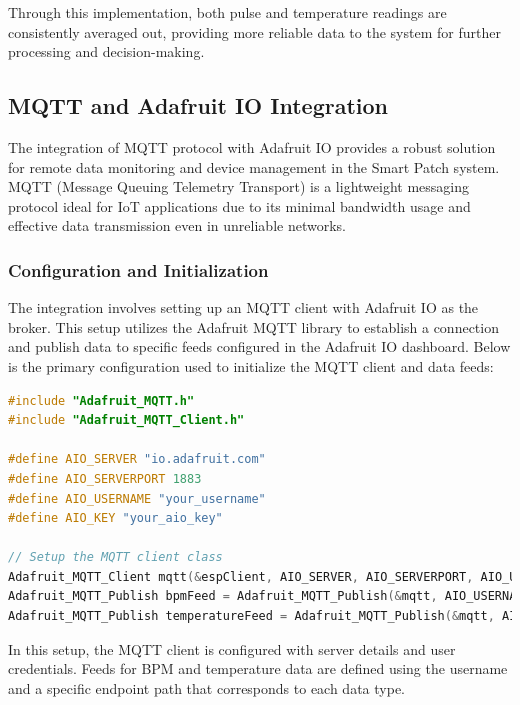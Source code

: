 \noindent Through this implementation, both pulse and temperature readings are consistently averaged out, providing more reliable data to the system for further processing and decision-making.




\subsection{MQTT and Adafruit IO Integration}

The integration of MQTT protocol with Adafruit IO provides a robust solution for remote data monitoring and device management in the Smart Patch system. MQTT (Message Queuing Telemetry Transport) is a lightweight messaging protocol ideal for IoT applications due to its minimal bandwidth usage and effective data transmission even in unreliable networks.

\subsubsection{Configuration and Initialization}

The integration involves setting up an MQTT client with Adafruit IO as the broker. This setup utilizes the Adafruit MQTT library to establish a connection and publish data to specific feeds configured in the Adafruit IO dashboard. Below is the primary configuration used to initialize the MQTT client and data feeds:

\begin{lstlisting}[language=C++, caption={MQTT and Adafruit IO Client Configuration}]
#include "Adafruit_MQTT.h"
#include "Adafruit_MQTT_Client.h"

#define AIO_SERVER "io.adafruit.com"
#define AIO_SERVERPORT 1883
#define AIO_USERNAME "your_username"
#define AIO_KEY "your_aio_key"

// Setup the MQTT client class
Adafruit_MQTT_Client mqtt(&espClient, AIO_SERVER, AIO_SERVERPORT, AIO_USERNAME, AIO_KEY);
Adafruit_MQTT_Publish bpmFeed = Adafruit_MQTT_Publish(&mqtt, AIO_USERNAME "/feeds/BPM");
Adafruit_MQTT_Publish temperatureFeed = Adafruit_MQTT_Publish(&mqtt, AIO_USERNAME "/feeds/Temperature");
\end{lstlisting}

In this setup, the MQTT client is configured with server details and user credentials. Feeds for BPM and temperature data are defined using the username and a specific endpoint path that corresponds to each data type. \\


